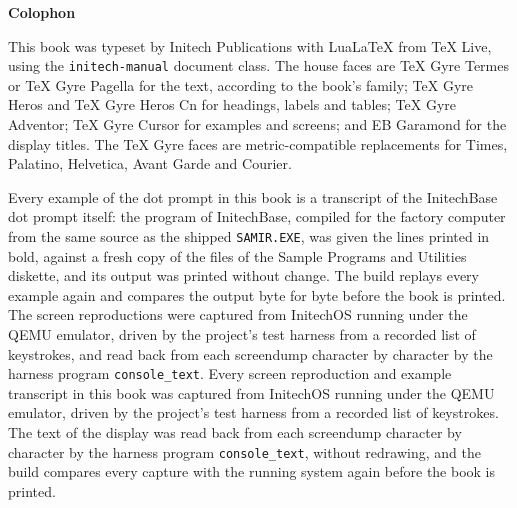\clearpage
\thispagestyle{empty}
\vspace*{\fill}
\noindent\hspace*{-\imHang}\begin{minipage}[b]{\imFullWidth}
\RaggedRight\small\setlength\parskip{4pt}
{\sffamily\bfseries Colophon\par}
\vspace{4pt}
This book was typeset by Initech Publications with LuaLaTeX from TeX Live,
using the \texttt{initech-manual} document class.  The house faces are TeX
Gyre Termes or TeX Gyre Pagella for the text, according to the book's
family; TeX Gyre Heros and TeX Gyre Heros Cn for headings, labels and
tables; TeX Gyre Adventor; TeX Gyre Cursor for examples and screens; and EB
Garamond for the display titles.  The TeX Gyre faces are metric-compatible
replacements for Times, Palatino, Helvetica, Avant Garde and Courier.

\ifdefined\ColophonScreens\ColophonScreens\else
\ifdefined\ColophonInitechBase
Every example of the dot prompt in this book is a transcript of the
InitechBase dot prompt itself: the program of InitechBase, compiled for the
factory computer from the same source as the shipped \texttt{SAMIR.EXE}, was
given the lines printed in bold, against a fresh copy of the files of the
Sample Programs and Utilities diskette, and its output was printed without
change.  The build replays every example again and compares the output byte
for byte before the book is printed.  The screen reproductions were captured
from InitechOS running under the QEMU emulator, driven by the project's test
harness from a recorded list of keystrokes, and read back from each
screendump character by character by the harness program
\texttt{console\_text}.
\else
Every screen reproduction and example transcript in this book was captured
from InitechOS running under the QEMU emulator, driven by the project's test
harness from a recorded list of keystrokes.  The text of the display was read
back from each screendump character by character by the harness program
\texttt{console\_text}, without redrawing, and the build compares every
capture with the running system again before the book is printed.
\fi\fi


\end{minipage}
